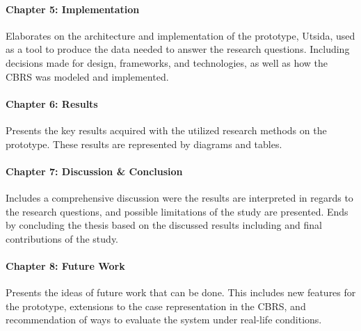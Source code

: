 \paragraph{Chapter 5: Implementation}
Elaborates on the architecture and implementation of the prototype, Utsida, used as a tool to produce the data needed to answer the research questions. Including decisions made for design, frameworks, and technologies, as well as how the CBRS was modeled and implemented.

\paragraph{Chapter 6: Results}
Presents the key results acquired with the utilized research methods on the prototype. These results are represented by diagrams and tables.

\paragraph{Chapter 7: Discussion \& Conclusion}
Includes a comprehensive discussion were the results are interpreted in regards to the research questions, and possible limitations of the study are presented. Ends by concluding the thesis based on the discussed results including and final contributions of the study.

\paragraph{Chapter 8: Future Work}
Presents the ideas of future work that can be done. This includes new features for the prototype, extensions to the case representation in the CBRS, and recommendation of ways to evaluate the system under real-life conditions. 


\cleardoublepage